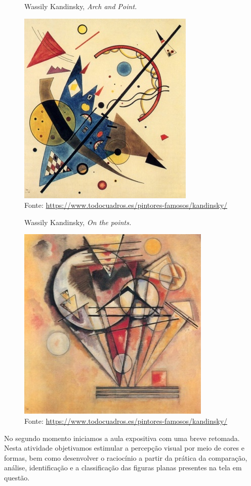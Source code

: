 \begin{refsection}
    \begin{figure}[ht]%
        \centering%
        \caption{Wassily Kandinsky, \textit{Arch and Point.}}%
        \includegraphics[width=.5\textwidth]{articles/04-matematica-na-arte--/figura4.jpeg}%
        \caption*{Fonte: \url{https://www.todocuadros.es/pintores-famosos/kandinsky/}}%
        \label{fig:arch-and-point}%
    \end{figure}%

    \begin{figure}[ht]%
        \centering%
        \caption{Wassily Kandinsky, \textit{On the points.}}%
        \includegraphics[width=.5\textwidth]{articles/04-matematica-na-arte--/figura5.jpeg}%
        \caption*{Fonte: \url{https://www.todocuadros.es/pintores-famosos/kandinsky/}}%
        \label{fig:on-the-point}%
    \end{figure}%

    No segundo momento iniciamos a aula expositiva com uma breve retomada. Nesta atividade objetivamos estimular a percepção visual por meio de cores e formas, bem como desenvolver o raciocínio a partir da prática da comparação, análise, identificação e a classificação das figuras planas presentes na tela em questão.  


\end{refsection}
